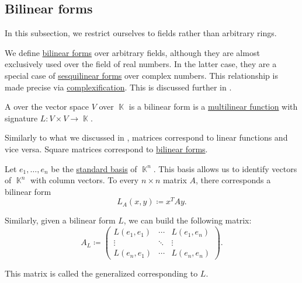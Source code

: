 \subsection{Bilinear forms}\label{subsec:bilinear_forms}

In this subsection, we restrict ourselves to fields rather than arbitrary rings.

We define \hyperref[def:bilinear_form]{bilinear forms} over arbitrary fields, although they are almost exclusively used over the field of real numbers. In the latter case, they are a special case of \hyperref[def:sesquilinear_form]{sesquilinear forms} over complex numbers. This relationship is made precise via \hyperref[def:complexification]{complexification}. This is discussed further in .

\begin{definition}\label{def:bilinear_form}
  A  over the vector space \( V \) over \( \BbbK \) is a bilinear form is a \hyperref[def:multilinear_function]{multilinear function} with signature \( L: V \times V \to \BbbK \).
\end{definition}

\begin{remark}\label{rem:matrices_as_bilinear_forms}
  Similarly to what we discussed in , matrices correspond to linear functions and vice versa. Square matrices correspond to \hyperref[def:bilinear_form]{bilinear forms}.

  Let \( e_1, \ldots, e_n \) be the \hyperref[def:sequence_space]{standard basis} of \( \BbbK^n \). This basis allows us to identify vectors of \( \BbbK^n \) with column vectors. To every \( n \times n \) matrix \( A \), there corresponds a bilinear form
  \begin{equation*}
    L_A(x, y) \coloneqq x^T A y.
  \end{equation*}

  Similarly, given a bilinear form \( L \), we can build the following matrix:
  \begin{equation*}
    A_L \coloneqq
    \begin{pmatrix}
      L(e_1, e_1) & \cdots & L(e_1, e_n) \\
      \vdots      & \ddots & \vdots      \\
      L(e_n, e_1) & \cdots & L(e_n, e_n)
    \end{pmatrix}.
  \end{equation*}

  This matrix is called the generalized  corresponding to \( L \).
\end{remark}

